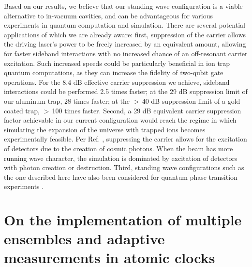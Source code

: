 Based on our results, we believe that our standing wave configuration is a viable alternative to in-vacuum cavities, and can be advantageous for various experiments in quantum computation and simulation. There are several potential applications of which we are already aware: first, suppression of the carrier allows the driving laser's power to be freely increased by an equivalent amount, allowing for faster sideband interactions with no increased chance of an off-resonant carrier excitation. Such increased speeds could be particularly beneficial in ion trap quantum computations, as they can increase the fidelity of two-qubit gate operations. For the 8.4 dB effective carrier suppression we achieve, sideband interactions could be performed 2.5 times faster; at the 29 dB suppression limit of our aluminum trap, 28 times faster; at the $>\,$40 dB suppression limit of a gold coated trap, $>\,$100 times faster. Second, a 29 dB equivalent carrier suppression factor achievable in our current configuration would reach the regime in which simulating the expansion of the universe with trapped ions becomes experimentally feasible. Per Ref. \cite{Menicucci10.NJP.12.095019}, suppressing the carrier allows for the excitation of detectors due to the creation of cosmic photons. When the beam has more running wave character, the simulation is dominated by excitation of detectors with photon creation or destruction. Third, standing wave configurations such as the one described here have also been considered for quantum phase transition experiments \cite{PhysRevLett.118.073001}.





\section{On the implementation of multiple ensembles and adaptive measurements in atomic clocks}

